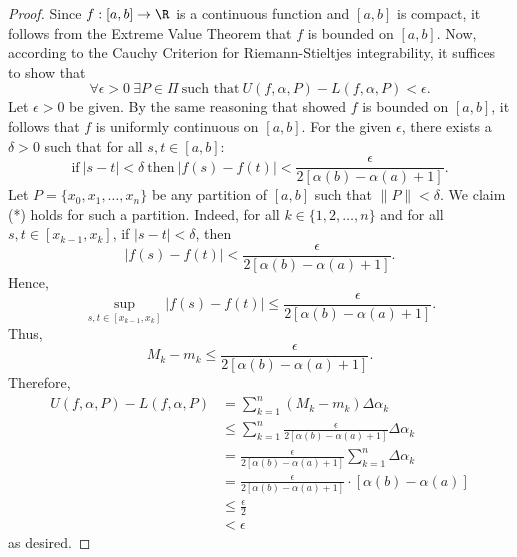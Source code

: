 \begin{proof} 
    Since \( f: [a,b] \to \R  \) is a continuous function and \( [a,b]  \) is compact, it follows from the Extreme Value Theorem that \( f  \) is bounded on \( [a,b] \). Now, according to the Cauchy Criterion for Riemann-Stieltjes integrability, it suffices to show that 
    \[  \forall \epsilon > 0 \ \exists P \in \Pi  \ \text{such that} \ U(f,\alpha,P) - L(f,\alpha,P) < \epsilon. \tag{*}\]
    Let \( \epsilon > 0  \) be given. By the same reasoning that showed \( f  \) is bounded on \( [a,b] \), it follows that \( f  \) is uniformly continuous on \( [a,b] \). For the given \( \epsilon  \), there exists a \( \delta > 0  \) such that for all \( s,t \in [a,b] \):
    \[  \text{if} \ | s - t  |  < \delta \ \text{then} \ | f(s) - f(t) | < \frac{ \epsilon }{  2 [\alpha(b) - \alpha(a) + 1 ] }. \]
    Let \( P = \{  {x}_{0}, {x}_{1}, \dots, {x}_{n} \}  \) be any partition of \( [a,b] \) such that \( \|P\| < \delta \). We claim (*) holds for such a partition. Indeed, for all \( k \in \{  1, 2, \dots, n  \}  \) and for all \( s,t \in [{x}_{k-1}, {x}_{k}] \), if \( | s-  t  |  < \delta \), then
    \[  | f(s) - f(t) |  < \frac{ \epsilon }{ 2 [\alpha(b) - \alpha(a) + 1 ] }. \]
    Hence, 
    \[  \sup_{s,t \in [{x}_{k-1}, {x}_{k}]} | f(s) - f(t) |  \leq \frac{ \epsilon }{ 2 [\alpha(b) - \alpha(a) + 1] }. \]
    Thus, 
    \[  {M}_{k } - {m}_{k } \leq \frac{ \epsilon }{ 2 [\alpha(b) - \alpha(a) + 1] }. \]
    Therefore, 
    \begin{align*}
        U(f,\alpha,P) - L(f,\alpha,P) &= \sum_{ k=1  }^{ n } ({M}_{k } - {m}_{k}) \Delta {\alpha}_{k } \\
                                      &\leq \sum_{ k=1  }^{ n } \frac{ \epsilon }{  2 [\alpha(b)- \alpha(a) + 1] }  \Delta {\alpha}_{k } \\
                                      &= \frac{ \epsilon }{ 2 [\alpha(b) - \alpha(a) + 1] }  \sum_{ k=1  }^{ n } \Delta {\alpha}_{k } \\
                                      &= \frac{ \epsilon }{ 2 [\alpha(b) - \alpha(a) + 1] }  \cdot [\alpha(b) - \alpha(a)] \\
                                      &\leq \frac{ \epsilon }{ 2 }  \\
                                      &< \epsilon
    \end{align*}
    as desired.


\end{proof}

